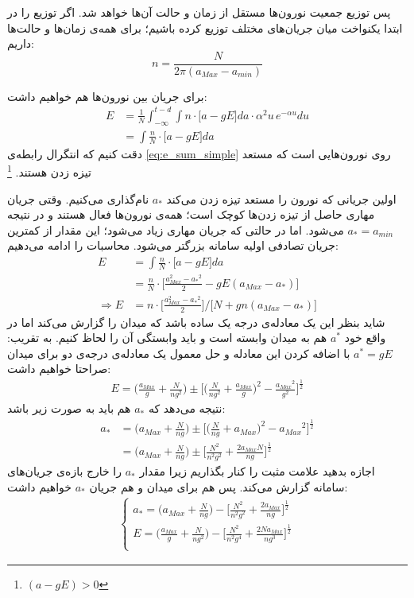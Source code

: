 پس توزیع جمعیت نورون‌‌ها مستقل از زمان و حالت آن‌ها خواهد شد. اگر توزیع را در ابتدا یکنواخت میان جریان‌های مختلف توزیع کرده باشیم؛ برای همه‌ی زمان‌ها و حالت‌ها داریم:
\begin{equation}
	n = \frac{N}{2 \pi (a_{Max} - a_{min}) }
\end{equation}


برای جریان بین نورون‌ها هم خواهیم داشت:
\begin{align}
	E &= \frac{1}{N} \int_{- \infty}^{t - d} \int n \cdot \big[ a - g E \big] da \cdot \alpha^2 u\, e^{-\alpha u} du\\
	&=  \int \frac{n}{N} \cdot \big[ a - g E \big] da \label{eq:e_sum_simple}
\end{align}
دقت کنیم که انتگرال رابطه‌ی \ref{eq:e_sum_simple} روی  نورون‌هایی است که مستعد تیزه زدن هستند.
\footnote{
	$(a - g E) > 0 $
}

اولین جریانی که نورون را مستعد تیزه زدن می‌کند $a_*$ نام‌گذاری می‌کنیم. وقتی جریان مهاری حاصل از تیزه زدن‌ها کوچک است؛ همه‌ی نورون‌ها فعال هستند و در نتیجه‌ 
$a_* = a_{min}$
می‌شود. اما در حالتی که جریان مهاری زیاد می‌شود؛ این مقدار از کمترین جریان تصادفی اولیه سامانه بزرگتر می‌شود. محاسبات را ادامه می‌دهیم:
\begin{align}
	E &=  \int \frac{n}{N} \cdot \big[ a - g E \big] da \\
	&= \frac{n}{N} \cdot \big[ \frac{a^2_{Max} - {a_*}^2}{2} - g E (a_{Max} - a_*) \big] \\
	\Rightarrow E &= n \cdot \big[ \frac{a^2_{Max} - {a_*}^2}{2}  \big] / \big[ N + g n (a_{Max} - a_*)\big]
	\label{}
\end{align}
شاید بنظر این یک معادله‌ی درجه یک ساده باشد که میدان را گزارش می‌کند اما در واقع خود $a^*$ هم به میدان وابسته است و باید وابستگی آن را لحاظ کنیم. به تقریب:
$a^{*} = gE$
با اضافه کردن این معادله و حل معمول یک معادله‌ی درجه‌ی دو برای میدان صراحتا خواهیم داشت:
\begin{align}
	E =  \big( \frac{a_{Max}}{g} + \frac{N}{n g^2}  \big) \pm \big[ \big( \frac{N}{n g^2} + \frac{a_{Max}}{g} \big)^2 - \frac{{a_{Max}}^2}{g^2} \big]^{\frac{1}{2}}
\end{align}
نتیجه می‌دهد که $a_{*}$ هم باید به صورت زیر باشد:
\begin{align}
	a_{*} &=  \big( a_{Max} + \frac{N}{n g} \big) \pm \big[ \big( \frac{N}{n g} + a_{Max} \big)^2 - {a_{Max}}^2 \big]^{\frac{1}{2}}\\
	&=  \big( a_{Max} + \frac{N}{n g} \big) \pm \big[  \frac{N^2}{n^2 g^2} + \frac{2a_{Max}N}{ng}  \big]^{\frac{1}{2}}
\end{align}
اجازه بدهید علامت مثبت را کنار بگذاریم زیرا مقدار $a_{*}$ را خارج بازه‌ی جریان‌های سامانه گزارش می‌کند. پس هم برای میدان و هم جریان $a_{*}$ خواهیم داشت:
\begin{align}
	\begin{cases}
		a_{*} =  \big( a_{Max} + \frac{N}{n g} \big) - \big[  \frac{N^2}{n^2 g^2} + \frac{2a_{Max}}{ng}  \big]^{\frac{1}{2}}\\
		E =  \big( \frac{a_{Max}}{g} + \frac{N}{n g^2} \big) - \big[ \frac{N^2}{n^2 g^4} + \frac{2Na_{Max}}{ng^3}  \big]^{\frac{1}{2}}\\
	\end{cases}
\end{align}

